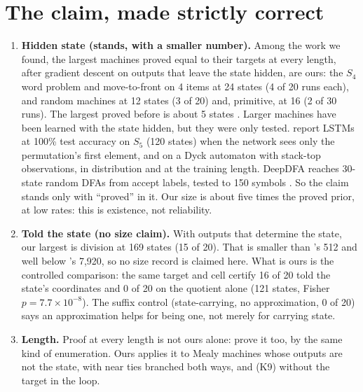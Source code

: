 \documentclass[11pt]{article}
\begin{document}
\section{The claim, made strictly correct}

\begin{enumerate}
\item \textbf{Hidden state (stands, with a smaller number).} Among the work we found, the largest
  machines proved equal to their targets at every length, after gradient descent on outputs that
  leave the state hidden, are ours: the $S_4$ word problem and move-to-front on 4 items at 24 states
  (4 of 20 runs each), and random machines at 12 states (3 of 20) and, primitive, at 16 (2 of 30
  runs). The largest proved before is about 5 states
  \citep{zeng-1993-self-clustering-recurrent-networks,aichernig-2024-learning-minimal-automata-rnn}.
  Larger machines have been learned with the state hidden, but they were only tested.
  \citet{liu-2022-transformers-shortcuts-automata} report LSTMs at 100\% test accuracy on $S_5$
  (120 states) when the network sees only the permutation's first element, and on a Dyck automaton
  with stack-top observations, in distribution and at the training length. DeepDFA reaches 30-state
  random DFAs from accept labels, tested to 150 symbols
  \citep{umili-2024-deepdfa-automata-learning-probabilistic-relaxations}. So the claim stands only
  with ``proved'' in it. Our size is about five times the proved prior, at low rates: this is
  existence, not reliability.
\item \textbf{Told the state (no size claim).} With outputs that determine the state, our largest is
  division at 169 states (15 of 20). That is smaller than
  \citeauthor{giles-1995-learning-class-large-finite-state-machines}'s 512 and well below
  \citeauthor{brandoit-2026-length-independent-state-tracking}'s 7{,}920, so no size record is claimed
  here. What is ours is the controlled comparison: the same target and cell certify 16 of 20 told the
  state's coordinates and 0 of 20 on the quotient alone (121 states, Fisher $p = 7.7 \times
  10^{-8}$). The suffix control (state-carrying, no approximation, 0 of 20) says an approximation
  helps for being one, not merely for carrying state.
\item \textbf{Length.} Proof at every length is not ours alone:
  \citeauthor{brandoit-2026-length-independent-state-tracking} prove it too, by the same kind of
  enumeration. Ours applies it to Mealy machines whose outputs are not the state, with near ties
  branched both ways, and (K9) without the target in the loop.
\end{enumerate}
\end{document}
